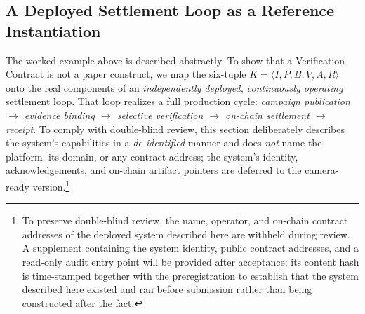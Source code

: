 \documentclass[sigconf,anonymous,review]{acmart}
\begin{document}
\subsection{A Deployed Settlement Loop as a Reference Instantiation}
\label{sec:instantiation}
The worked example above is described abstractly. To show that a Verification Contract is not a paper construct, we map the six-tuple $K=\langle I,P,B,V,A,R\rangle$ onto the real components of an \emph{independently deployed, continuously operating} settlement loop. That loop realizes a full production cycle: \emph{campaign publication $\to$ evidence binding $\to$ selective verification $\to$ on-chain settlement $\to$ receipt}. To comply with double-blind review, this section deliberately describes the system's capabilities in a \emph{de-identified} manner and does \emph{not} name the platform, its domain, or any contract address; the system's identity, acknowledgements, and on-chain artifact pointers are deferred to the camera-ready version.\footnote{To preserve double-blind review, the name, operator, and on-chain contract addresses of the deployed system described here are withheld during review. A supplement containing the system identity, public contract addresses, and a read-only audit entry point will be provided after acceptance; its content hash is time-stamped together with the preregistration to establish that the system described here existed and ran before submission rather than being constructed after the fact.}
\end{document}

